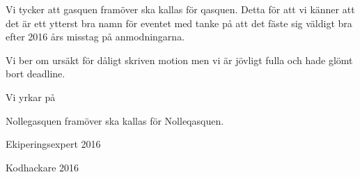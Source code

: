 \documentclass[../_main/handlingar.tex]{subfiles}
\begin{document}

Vi tycker att gasquen framöver ska kallas för qasquen. Detta för att vi känner att det är ett ytterst bra namn för eventet med tanke på att det fäste sig väldigt bra efter 2016 års misstag på anmodningarna.

Vi ber om ursäkt för dåligt skriven motion men vi är jövligt fulla och hade glömt bort deadline.

Vi yrkar på
\begin{attsatser}
    \att Nollegasquen framöver ska kallas för Nolleqasquen.
\end{attsatser}

\begin{signatures}{2}
    \mvh
    \signature{Daniel Bakic}{Ekiperingsexpert 2016}
    \signature{Axel Voss}{Kodhackare 2016}
\end{signatures}
\end{document}
